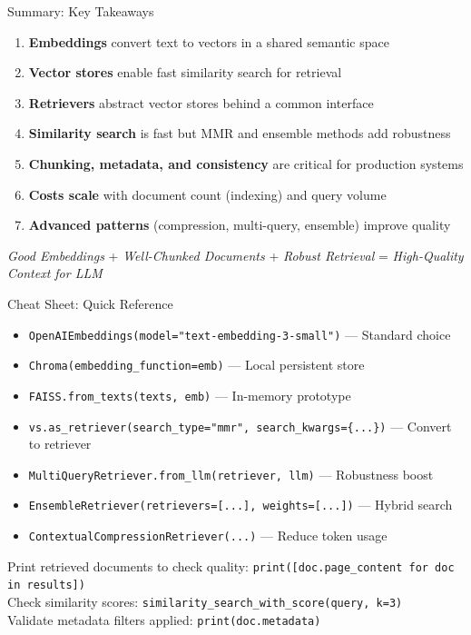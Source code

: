 \documentclass[aspectratio=169,11pt]{beamer}
\begin{document}
\begin{frame}{Summary: Key Takeaways}
  \begin{enumerate}
    \setlength{\itemsep}{0pt}
    \item \textbf{Embeddings} convert text to vectors in a shared semantic space
    \item \textbf{Vector stores} enable fast similarity search for retrieval
    \item \textbf{Retrievers} abstract vector stores behind a common interface
    \item \textbf{Similarity search} is fast but MMR and ensemble methods add robustness
    \item \textbf{Chunking, metadata, and consistency} are critical for production systems
    \item \textbf{Costs scale} with document count (indexing) and query volume
    \item \textbf{Advanced patterns} (compression, multi-query, ensemble) improve quality
  \end{enumerate}

  \vspace{0.07cm}
  \begin{conceptbox}
    \textit{Good Embeddings} + \textit{Well-Chunked Documents} + \textit{Robust Retrieval} = \textit{High-Quality Context for LLM}
  \end{conceptbox}
\end{frame}

\begin{frame}{Cheat Sheet: Quick Reference}
  \begin{itemize}
    \setlength{\itemsep}{1pt}
    \item \texttt{OpenAIEmbeddings(model="text-embedding-3-small")} — Standard choice
    \item \texttt{Chroma(embedding\_function=emb)} — Local persistent store
    \item \texttt{FAISS.from\_texts(texts, emb)} — In-memory prototype
    \item \texttt{vs.as\_retriever(search\_type="mmr", search\_kwargs=\{...\})} — Convert to retriever
    \item \texttt{MultiQueryRetriever.from\_llm(retriever, llm)} — Robustness boost
    \item \texttt{EnsembleRetriever(retrievers=[...], weights=[...])} — Hybrid search
    \item \texttt{ContextualCompressionRetriever(...)} — Reduce token usage
  \end{itemize}

  \vspace{0.05cm}
  \begin{warningbox}
    Print retrieved documents to check quality: \texttt{print([doc.page\_content for doc in results])}\\
    Check similarity scores: \texttt{similarity\_search\_with\_score(query, k=3)}\\
    Validate metadata filters applied: \texttt{print(doc.metadata)}
  \end{warningbox}
\end{frame}
\end{document}
